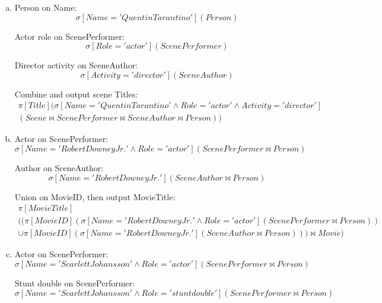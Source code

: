 \documentclass{article}
\begin{document}
\begin{enumerate}[(a)]
\item
Person on Name:
\begin{equation}
\sigma\left[Name='Quentin Tarantino'\right](Person)
\end{equation}

Actor role on ScenePerformer:
\begin{equation}
\sigma\left[Role='actor'\right](ScenePerformer)
\end{equation}

Director activity on SceneAuthor:
\begin{equation}
\sigma\left[Activity='director'\right](SceneAuthor)
\end{equation}

Combine and output scene Titles:
\begin{multline}
\pi\left[Title\right](\sigma\left[Name='Quentin Tarantino' \land Role='actor' \land Activity='director'\right]\\
 (Scene \Join ScenePerformer \Join SceneAuthor \Join Person))
\end{multline}

\item
Actor on ScenePerformer:
\begin{equation}
\sigma\left[Name='Robert Downey Jr.' \land Role='actor'\right](ScenePerformer \Join Person)
\end{equation}

Author on SceneAuthor:
\begin{equation}
\sigma\left[Name='Robert Downey Jr.'\right](SceneAuthor \Join Person)
\end{equation}

Union on MovieID, then output MovieTitle:
\begin{multline}
\pi\left[MovieTitle\right]\\
 ((\pi\left[MovieID\right](\sigma\left[Name='Robert Downey Jr.' \land Role='actor'\right](ScenePerformer \Join Person))\\
 \cup \pi\left[MovieID\right](\sigma\left[Name='Robert Downey Jr.'\right](SceneAuthor \Join Person))) \Join Movie)
\end{multline}

\item
Actor on ScenePerformer:
\begin{equation}
\sigma\left[Name='Scarlett Johansson' \land Role='actor'\right](ScenePerformer \Join Person)
\end{equation}

Stunt double on ScenePerformer:
\begin{equation}
\sigma\left[Name='Scarlett Johansson' \land Role='stunt double'\right](ScenePerformer \Join Person)
\end{equation}


\end{enumerate}
\end{document}
